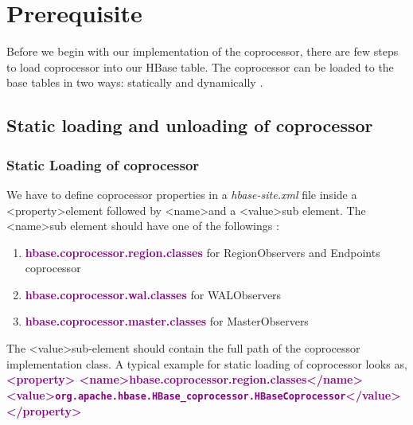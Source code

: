 \documentclass[11pt,a4paper,bibtotoc,idxtotoc,headsepline,footsepline,footexclude,BCOR12mm,DIV13]{scrbook}
\begin{document}
\section{Prerequisite}
Before we begin with our implementation of the coprocessor, there are few steps to load coprocessor into our HBase table. The coprocessor can be loaded to the base tables in two ways: statically and dynamically \cite{hbase:site}. 

\subsection{Static loading and unloading of coprocessor}

\subsubsection{Static Loading of coprocessor}
We have to define coprocessor properties in a \emph{hbase-site.xml} file inside a \textless property\textgreater \space element followed by \textless name\textgreater \space and a \textless value\textgreater \space sub element. The \textless name\textgreater \space sub element should have one of the followings \cite{hbase:site}:


\begin{enumerate}
	
    \item \textbf{\textcolor{purple} {hbase.coprocessor.region.classes}} for RegionObservers and Endpoints coprocessor
    \item \textbf{\textcolor{purple} {hbase.coprocessor.wal.classes}} for WALObservers
    \item \textbf{\textcolor{purple} {hbase.coprocessor.master.classes}} for MasterObservers
    
\end{enumerate}


The \textless value\textgreater \space sub-element should contain the full path of the coprocessor implementation class. A typical example for static loading of coprocessor looks as,\newline \newline
\textbf{\textcolor{purple}{
\textless property\textgreater \newline
\textless name\textgreater hbase.coprocessor.region.classes\textless /name\textgreater \newline
\textless value\textgreater \texttt{org.apache.hbase.HBase\_coprocessor.HBaseCoprocessor}\textless /value\textgreater \newline
\textless /property\textgreater}} \newline
\end{document}
